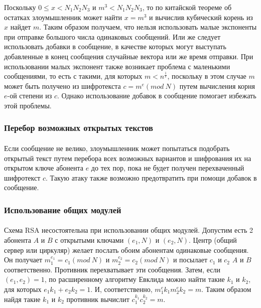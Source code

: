   Поскольку $0 \le x < N_1 N_2 N_3$ и $m^3 < N_1 N_2 N_3$, то по китайской теореме об остатках злоумышленник может найти 
  $x = m^3$ и вычислив кубический корень из $x$ найдет $m$. Таким образом получаем, что нельзя использовать малые экспоненты 
  при отправке большого числа одинаковых сообщений. Или же следует использовать добавки в сообщение, в качестве которых могут выступать добавленные в 
  конец сообщения случайные вектора или же время отправки. При использовании малых экспонент также возникает проблема с маленькими сообщениями, то есть 
  с такими, для которых $m < n^{\frac{1}{e}}$, поскольку в этом случае $m$ может быть получено из шифротекста 
  $c = m^e(mod \: N)$ путем вычисления корня $e$-ой степени из $c$. Однако использование добавок в сообщение помогает избежать этой 
  проблемы.

\subsubsection{Перебор возможных открытых текстов}

  \paragraph{} Если сообщение не велико, злоумышленник может попытаться подобрать открытый текст путем перебора всех возможных вариантов и 
  шифрования их на открытом ключе абонента $e$ до тех пор, пока не будет получен перехваченный шифротекст $c$. Такую атаку также возможно 
  предотвратить при помощи добавок в сообщение.

\subsubsection{Использование общих модулей}

  \paragraph{} Схема RSA несостоятельна при использовании общих модулей. Допустим есть 2 абонента $A$ и $B$ с открытыми ключами 
  $(e_{1}, N)$ и $(e_{2}, N)$. Центр (общий сервер или циркуляр) желает послать обоим абонентам одинаковые сообщения. 
  Он получает $m_1^{e_1} = c_1(mod \: N)$ и $m_2^{e_2} = c_2(mod \: N)$ и посылает $c_1$ и 
  $c_2$ $A$ и $B$ соответственно. Противник перехватывает эти сообщения. Затем, если $(e_1, e_2) = 1$, по 
  расширенному алгоритму Евклида можно найти такие $k_1$ и $k_2$, для которых $e_1 k_1 + e_2 k_2 = 1$. И, соответственно, 
  $m_1^e k_1 m_2^e k_2 = m$. Таким образом найдя такие $k_1$ и $k_2$ противник вычислит $c_1^{k_1} c_2^{k_2} = m$.

